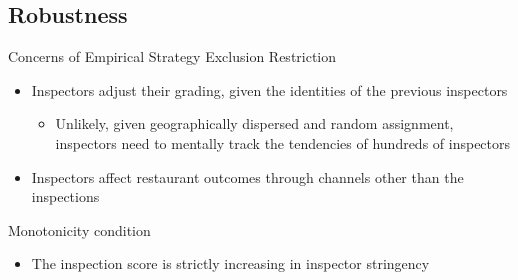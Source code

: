 \documentclass[handout]{beamer}
\begin{document}
\subsection{Robustness}
\begin{frame}{Concerns of Empirical Strategy}
Exclusion Restriction
\begin{itemize}
\item Inspectors adjust their grading, given the identities of the previous inspectors
\begin{itemize}
\item Unlikely, given geographically dispersed and random assignment, inspectors need to mentally track the tendencies of hundreds of inspectors
\end{itemize}
\item Inspectors affect restaurant outcomes through channels other than the inspections
\end{itemize}
\pause
Monotonicity condition
\begin{itemize}
    \item The inspection score is strictly increasing in inspector stringency
\end{itemize}
\end{frame}
\end{document}
